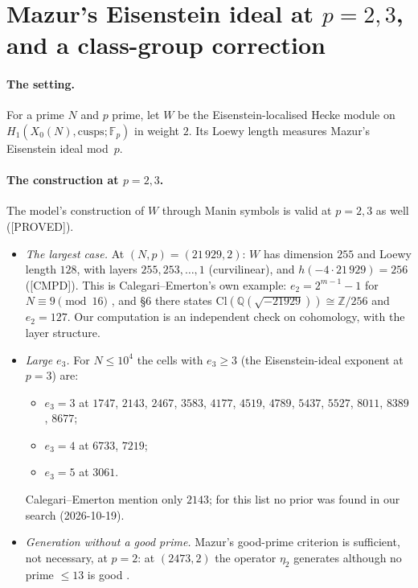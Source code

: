 \documentclass[11pt]{article}
\newcommand{\Z}{\mathbb{Z}}
\newcommand{\Q}{\mathbb{Q}}
\newcommand{\F}{\mathbb{F}}
\newcommand{\PROVED}{\textsf{\small[PROVED]}}
\newcommand{\CMPD}{\textsf{\small[CMPD]}}
\begin{document}
\section{Mazur's Eisenstein ideal at \texorpdfstring{$p=2,3$}{p=2,3}, and a class-group correction}\label{sec:pg-mazur23}

\paragraph{The setting.} For a prime $N$ and $p$ prime, let $W$ be the Eisenstein-localised Hecke module on
$H_1(X_0(N),\text{cusps};\F_p)$ in weight $2$. Its Loewy length measures Mazur's Eisenstein ideal mod~$p$.

\paragraph{The construction at $p=2,3$.} The model's construction of $W$ through Manin symbols is valid at $p=2,3$ as well
{} (\PROVED).
\begin{itemize}[leftmargin=1.6em,itemsep=1pt]
\item \emph{The largest case.} At $(N,p)=(21\,929,2)$: $W$ has dimension $255$ and Loewy length $128$, with layers $255,253,\dots,1$
  (curvilinear), and $h(-4\cdot21\,929)=256$ (\CMPD). This is Calegari--Emerton's own example: $e_2=2^{m-1}-1$ for
  $N\equiv9\pmod{16}$ \cite[Thm.~1.1]{calegari_emerton}, and \S6 there states $\mathrm{Cl}(\Q(\sqrt{-21929}))\cong\Z/256$ and $e_2=127$. Our
  computation is an independent check on cohomology, with the layer structure.
\item \emph{Large $e_3$.} For $N\le10^{4}$ the cells with $e_3\ge3$ (the Eisenstein-ideal exponent at $p=3$) are:
  \begin{itemize}[itemsep=0pt]
  \item $e_3=3$ at $1747$, $2143$, $2467$, $3583$, $4177$, $4519$, $4789$, $5437$, $5527$, $8011$, $8389$, $8677$;
  \item $e_3=4$ at $6733$, $7219$;
  \item $e_3=5$ at $3061$.
  \end{itemize}
  Calegari--Emerton mention only $2143$; for this list no prior was found in our search (2026-10-19).
\item \emph{Generation without a good prime.} Mazur's good-prime criterion is sufficient, not necessary, at $p=2$: at $(2473,2)$ the
  operator $\eta_2$ generates although no prime $\le13$ is good {}.
\end{itemize}
\end{document}
